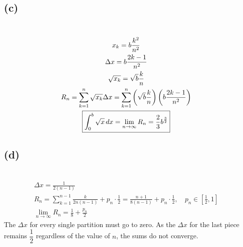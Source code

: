 \documentclass[12pt]{article}
\newcommand*{\paren}[1]{\ensuremath\left(#1\right)}
\newcommand{\subproblem}[1]{\subsection{(#1)} \,}
\begin{document}
\subproblem{c}
\begin{gather*}
    x_k=b\frac{k^2}{n^2}\\
    \Delta x =b\frac{2k-1}{n^2}\\
    \sqrt{x_k}=\sqrt{b}\frac{k}{n}\\
    R_n=\sum_{k=1}^n \sqrt{x_k} \Delta x=\sum_{k=1}^n \paren{\sqrt{b}\frac{k}{n}}\paren{b\frac{2k-1}{n^2}}\\
    \boxed{\int_0^b \sqrt{x}\, dx= \lim_{n \to \infty} R_n= \frac{2}{3}b^\frac{3}{2}}
\end{gather*}

\subproblem{d}
\begin{gather*}
    \Delta x=\frac{1}{2(n-1)}\\
    R_n=\sum_{k=1}^{n-1} \frac{k}{2n(n-1)}+p_n\cdot \frac{1}{2}=\frac{n+1}{8(n-1)}+p_n\cdot \frac{1}{2},\quad p_n\in [\frac{1}{2},1]\\
    \boxed{\lim_{n\to \infty} R_n=\frac{1}{8}+\frac{p_n}{2}}
\end{gather*}
The $\Delta x$ for every single partition must go to zero. As the $\Delta x$ for the last piece remains $\dfrac{1}{2}$ regardless of the value of $n$, the sums do not converge.
\end{document}
